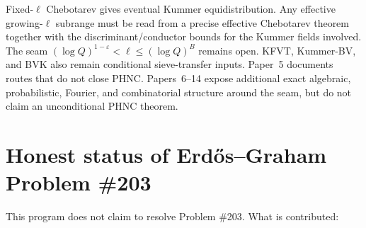 \documentclass[11pt]{article}
\newcommand{\1}{\mathbf 1}
\begin{document}
Fixed-\(\ell\) Chebotarev gives eventual Kummer equidistribution.  Any effective growing-\(\ell\) subrange must be read from a precise effective Chebotarev theorem together with the discriminant/conductor bounds for the Kummer fields involved.  The seam \((\log Q)^{1-\varepsilon}<\ell\le(\log Q)^B\) remains open.  KFVT, Kummer-BV, and BVK also remain conditional sieve-transfer inputs.  Paper~5 documents routes that do not close PHNC.  Papers~6--14 expose additional exact algebraic, probabilistic, Fourier, and combinatorial structure around the seam, but do not claim an unconditional PHNC theorem.

\section{Honest status of Erd\H{o}s--Graham Problem \#203}

This program does not claim to resolve Problem \#203.  What is contributed:
\end{document}
